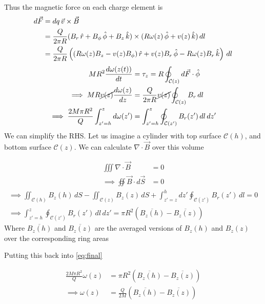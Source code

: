 \documentclass[../main.tex]{subfiles}
\begin{document}
\begin{questions}
\begin{parts}
\begin{solution}
		Thus the magnetic force on each charge element is
		\begin{align}
			d\vec{F} &= dq \,\vec{v}\times\vec{B}
			\\
			&= \frac{Q}{2\pi R} (B_r\,\hat{r}+B_\phi\,\hat{\phi}+B_z\,\hat{k})\times(R\omega(z)\,\hat{\phi}+v(z)\,\hat{k})\,dl
			\\
			&=\frac{Q}{2\pi R}\left((R\omega(z)B_z-v(z)B_\phi)\,\hat{r}+v(z)B_r\,\hat{\phi}-R\omega(z)B_r\,\hat{k}\right)\,dl
		\end{align}
		\begin{align}
			MR^2\frac{d\omega(z(t))}{dt} &= \tau_z = R\oint_{\mathcal{C}(z)} d\vec{F}\cdot \hat{\phi}
			\\
			\implies MR\cancel{v(z)}\frac{d\omega(z)}{dz} &= \frac{Q}{2\pi R}\cancel{v(z)}\oint_{\mathcal{C}(z)} B_{r}\,dl\label{eq:omega}
			\\
			\implies \frac{2M\pi R^2}{Q}\int_{z'=h}^{z} d\omega(z') &= \int_{z'=h}^{z} \oint_{\mathcal{C}(z')} B_r(z')\,dl\,dz'\label{eq:final}
		\end{align}
		We can simplify the RHS. Let us imagine a cylinder with top surface $\mathcal{C}(h)$, and bottom surface $\mathcal{C}(z)$. We can calculate $\nabla\cdot \vec{B}$ over this volume

		\begin{align}
			\iiint \nabla\cdot \vec{B} &= 0
			\\
			\implies \oiint \vec{B}\cdot d\vec{S} &= 0
		\end{align}
		\begin{gather}
			\implies \iint_{\mathcal{C}(h)} B_z(h)\,dS - \iint_{\mathcal{C}(z)} B_z(z)\,dS + \int_{z'=z}^{h}dz'\oint_{\mathcal{C}(z')} B_r(z')\,dl = 0
			\\
			\implies \int_{z'=h}^{z} \oint_{\mathcal{C}(z')} B_r(z')\,dl\,dz' = \pi R^2\left(\overline{B_z(h)}-\overline{B_z(z)}\right)
		\end{gather}
		Where $\overline{B_z(h)}$ and $\overline{B_z(z)}$ are the averaged versions of $B_z(h)$ and $B_z(z)$ over the corresponding ring areas

		Putting this back into \eqref{eq:final}

		\begin{align}
			\frac{2M\pi R^2}{Q}\omega(z) &= \pi R^2\left(\overline{B_z(h)}-\overline{B_z(z)}\right)
			\\
			\implies \omega(z) &= \frac{Q}{2M}\left(\overline{B_z(h)}-\overline{B_z(z)}\right)
		\end{align}


\end{solution}
\end{parts}
\end{questions}
\end{document}
